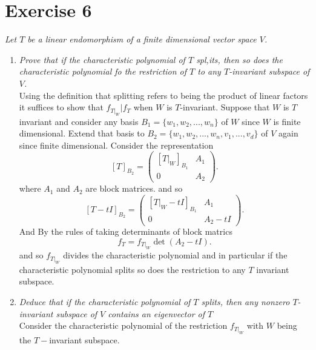\documentclass{article}
\begin{document}
    \section{Exercise 6}\emph{ Let $T$ be a linear endomorphism of a finite dimensional vector
    space $V$.}
    \begin{enumerate}
        \item \emph{Prove that if the characteristic polynomial of $T$ spl,its, then so does the characteristic polynomial
            fo the restriction of $T$ to any $T$-invariant subspace of $V$.}\\
                Using the definition that splitting refers to being the product of linear factors it suffices to show that
                $f_{T|_W} | f_{T}$ when $W$ is $T$-invariant.
                Suppose that $W$ is $T$ invariant and consider any basis $B_1 = \{w_1,w_2,...,w_n\}$ of  $W$ since $W$ is finite dimensional.
                Extend that basis to $B_2 = \{w_1,w_2,...,w_n,v_1,...,v_d\}$ of $V$ again since finite dimensional. 
                Consider the representation
                \[
                    [T]_{B_2} = \begin{pmatrix} 
                        [T|_W]_{B_1} & A_1 \\
                        0 & A_2
                    \end{pmatrix} 
                .\] 
                where $A_1$ and $A_2$ are block matrices. and so
                \[
                    [T-tI]_{B_2} = \begin{pmatrix}  
                        [T|_W-tI]_{B_1} & A_1\\
                        0 & A_2-tI
                    \end{pmatrix} 
                .\] 
                And By the rules of taking determinants of block matrics
                \[
                    f_T = f_{T|_W}\det(A_2-tI)
                .\] 
                and so $f_{T|_W}$ divides the characteristic polynomial and in particular if 
                the characteristic polynomial splits so does the restriction to any $T$ invariant subspace.
            \item \emph{
                    Deduce that if the characteristic polynomial of $T$ splits, then any nonzero $T$-invariant subspace of $V$ 
                    contains an eigenvector of  $T$\\
                }
                Consider the characteristic polynomial of the restriction $f_{T|_W}$ with $W$ being the $T-$invariant subspace.

\end{enumerate}
\end{document}
